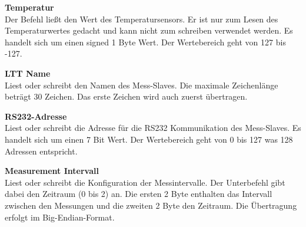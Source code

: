 \textbf{Temperatur}\\
Der Befehl ließt den Wert des Temperatursensors. Er ist nur zum Lesen des Temperaturwertes gedacht und kann nicht zum schreiben verwendet werden. Es handelt sich um einen signed 1 Byte Wert. Der Wertebereich geht von 127 bis -127.\ 

\textbf{LTT Name}\\
Liest oder schreibt den Namen des Mess-Slaves. Die maximale Zeichenlänge beträgt 30 Zeichen. Das erste Zeichen wird auch zuerst übertragen.\ 

\textbf{RS232-Adresse}\\
Liest oder schreibt die Adresse für die RS232 Kommunikation des Mess-Slaves. Es handelt sich um einen 7 Bit Wert. Der Wertebereich geht von 0 bis 127 was 128 Adressen entspricht.\ 

\textbf{Measurement Intervall}\\
Liest oder schreibt die Konfiguration der Messintervalle. Der Unterbefehl gibt dabei den Zeitraum (0 bis 2) an. Die ersten 2 Byte enthalten das Intervall zwischen den Messungen und die zweiten 2 Byte den Zeitraum. Die Übertragung erfolgt im Big-Endian-Format.\ 

